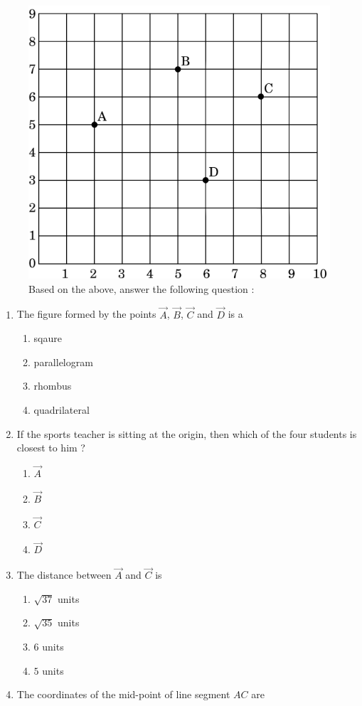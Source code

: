 \begin{enumerate}[label=\thesection.\arabic*.,ref=\thesection.\theenumi]
	     	     \begin{figure}[ht]
		     \centering
		     \includegraphics[width=0.45\columnwidth,height=0.45\columnwidth]{figs/fwc3.png}
		     \caption{Based on the above, answer the following question :}
		     \label{fig:my_label}
	     \end{figure}
\begin{enumerate}[label=(\roman*)]
	\item The figure formed by the points $\vec{A}$, $\vec{B}$, $\vec{C}$ and $\vec{D}$ is a
		\begin{enumerate}[label=(\Alph*)]
			\item sqaure
			\item parallelogram
			\item rhombus
			\item quadrilateral
		\end{enumerate}
	\item If the sports teacher is sitting at the origin, then which of the four students is closest to him ?
		\begin{enumerate}[label=(\Alph*)]
			\item $\vec{A}$
			\item $\vec{B}$
			\item $\vec{C}$
			\item $\vec{D}$
		\end{enumerate}
	\item The distance between $\vec{A}$ and $\vec{C}$ is 
		\begin{enumerate}[label=(\Alph*)]
			\item $\sqrt{37}$ units
			\item $\sqrt{35}$ units
			\item $6$ units
			\item $5$ units
		\end{enumerate}
	\item The coordinates of the mid-point of line segment $AC$ are

\end{enumerate}
\end{enumerate}
